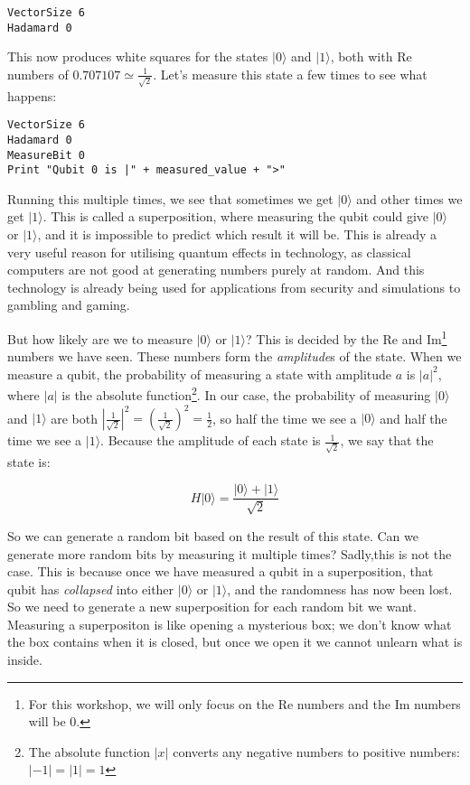 \documentclass[twocolumn]{article}
\begin{document}
\begin{lstlisting}
VectorSize 6
Hadamard 0
\end{lstlisting}

This now produces white squares for the states $|0\rangle$ and $|1\rangle$, both with Re numbers of $0.707107 \simeq \frac{1}{\sqrt{2}}$. Let's measure this state a few times to see what happens:

\begin{lstlisting}
VectorSize 6
Hadamard 0
MeasureBit 0
Print "Qubit 0 is |" + measured_value + ">"
\end{lstlisting}

Running this multiple times, we see that sometimes we get $|0\rangle$ and other times we get $|1\rangle$. This is called a superposition, where measuring the qubit could give $|0\rangle$ or $|1\rangle$, and it is impossible to predict which result it will be. This is already a very useful reason for utilising quantum effects in technology, as classical computers are not good at generating numbers purely at random. And this technology is already being used for applications from security and simulations to gambling and gaming.

But how likely are we to measure $|0\rangle$ or $|1\rangle$? This is decided by the Re and Im\footnote{For this workshop, we will only focus on the Re numbers and the Im numbers will be $0$.} numbers we have seen. These numbers form the {\em amplitude}s of the state. When we measure a qubit, the probability of measuring a state with amplitude $a$ is $|a|^2$, where $|a|$ is the absolute function\footnote{The absolute function $|x|$ converts any negative numbers to positive numbers: $|-1| = |1| = 1$}. In our case, the probability of measuring $|0\rangle$ and $|1\rangle$ are both $\left|\frac{1}{\sqrt{2}}\right|^2 = \left(\frac{1}{\sqrt{2}}\right)^2 = \frac{1}{2}$, so half the time we see a $|0\rangle$ and half the time we see a $|1\rangle$. Because the amplitude of each state is $\frac{1}{\sqrt{2}}$, we say that the state is:

$$H|0\rangle = \frac{|0\rangle + |1\rangle}{\sqrt{2}}$$

So we can generate a random bit based on the result of this state. Can we generate more random bits by measuring it multiple times? Sadly,this is not the case. This is because once we have measured a qubit in a superposition, that qubit has {\em collapsed} into either $|0\rangle$ or $|1\rangle$, and the randomness has now been lost. So we need to generate a new superposition for each random bit we want. Measuring a superpositon is like opening a mysterious box; we don't know what the box contains when it is closed, but once we open it we cannot unlearn what is inside.
\end{document}

